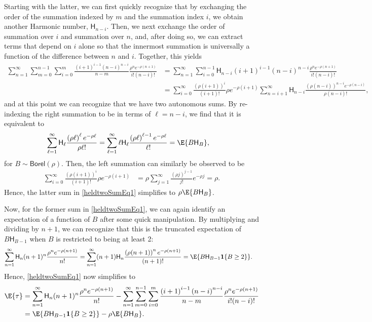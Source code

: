 Starting with the latter, we can first quickly recognize that by exchanging the order of the summation indexed by $m$ and the summation index $i$, we obtain another Harmonic number, $\mathsf{H}_{n-i}$. Then, we next exchange the order of summation over $i$ and summation over $n$, and, after doing so, we can extract terms that depend on $i$ alone so that the innermost summation is universally a function of the difference between $n$ and $i$. Together, this yields
\begin{align}
\sum_{n=1}^\infty
\sum_{m=0}^{n-1}
\sum_{i=0}^m
\frac{\left({i+1}\right)^{i-1}
\left({n-i}\right)^{n-i}}{n-m}
 \frac{\rho^n e^{-\rho(n+1)}}{i!(n-i)!}
 &=
 \sum_{n=1}^\infty
\sum_{i=0}^{n-1}
\mathsf{H}_{n-i}
\left({i+1}\right)^{i-1}
\left({n-i}\right)^{n-i}
 \frac{\rho^n e^{-\rho(n+1)}}{i!(n-i)!}
 \\
  &=
 \sum_{i=0}^\infty
 \frac{\left(\rho({i+1})\right)^{i} }{(i+1)!}
 \rho e^{-\rho(i+1)}
\sum_{n=i+1}^{\infty}
\mathsf{H}_{n-i}
 \frac{\left(\rho(n-i)\right)^{n-i} e^{-\rho(n-i)}}{\rho(n-i)!}
 ,
\end{align}
and at this point we can recognize that we have two autonomous sums. By re-indexing the right summation to be in terms of $\ell = n - i$, we find that it is equivalent to
\begin{align}
\sum_{\ell=1}^{\infty}
\mathsf{H}_{\ell}
 \frac{\left(\rho\ell\right)^{\ell} e^{-\rho\ell}}{\rho \ell!}
 &=
 \sum_{\ell=1}^{\infty}
\ell \mathsf{H}_{\ell}
 \frac{\left(\rho\ell\right)^{\ell-1} e^{-\rho\ell}}{ \ell!}
 =
 \E{B \mathsf{H}_B}
 ,
\end{align}
for $B \sim \mathsf{Borel}(\rho)$. Then, the left summation can similarly be observed to be 
\begin{align}
 \sum_{i=0}^\infty
 \frac{\left(\rho({i+1})\right)^{i} }{(i+1)!}
 \rho e^{-\rho(i+1)}
 &=
 \rho
  \sum_{j=1}^\infty
 \frac{\left(\rho j\right)^{j-1} }{j!}
 e^{-\rho j}
 =
 \rho
 .
\end{align}
Hence, the latter sum in \eqref{heldtwoSumEq1} simplifies to $\rho \E{B \mathsf{H}_B}$.

Now, for the former sum in \eqref{heldtwoSumEq1}, we can again identify an expectation of a function of $B$ after some quick manipulation. By multiplying and dividing by $n+1$, we can recognize that this is the truncated expectation of $B \mathsf{H}_{B-1}$ when $B$ is restricted to being at least 2:
\begin{align}
\sum_{n=1}^\infty 
\mathsf{H}_n (n+1)^{n} \frac{\rho^n e^{-\rho(n+1)}}{n!}
&=
\sum_{n=1}^\infty 
(n+1)\mathsf{H}_n  \frac{\left(\rho(n+1)\right)^n e^{-\rho(n+1)}}{(n+1)!}
=
\E{B \mathsf{H}_{B-1} \mathbf{1}\{B \geq 2\}}
.
\end{align}
Hence, \eqref{heldtwoSumEq1} now simplifies to
\begin{align}
\E{\tau}
&=
\sum_{n=1}^\infty 
\mathsf{H}_n (n+1)^{n} \frac{\rho^n e^{-\rho(n+1)}}{n!}
-
\sum_{n=1}^\infty
\sum_{m=0}^{n-1}
\sum_{i=0}^m
\frac{\left({i+1}\right)^{i-1}
\left({n-i}\right)^{n-i}}{n-m}
 \frac{\rho^n e^{-\rho(n+1)}}{i!(n-i)!}
\\
&=
\E{B \mathsf{H}_{B-1} \mathbf{1}\{B \geq 2\}}
-
\rho \E{B \mathsf{H}_{B}}
.
\end{align}

